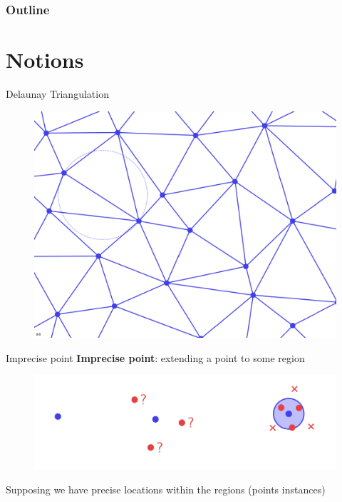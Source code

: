 \documentclass{beamer}
\begin{document}
\begin{frame}
\frametitle{Outline}
\tableofcontents
\end{frame}

\section{Notions}
\frame{\tableofcontents[currentsection]}

\begin{frame}{Delaunay Triangulation}
\begin{figure}
		\centering
	\includegraphics[scale=0.3]{img/delaunayTriangulation.png}
	\end{figure}
\end{frame}

\begin{frame}{Imprecise point}
\textbf{Imprecise point}: extending a point to some region
\begin{figure}
		\centering
	\includegraphics[width=\textwidth]{img/imprecise_point.png}
	\end{figure}
\pause
Supposing we have precise locations within the regions (points instances)
\end{frame}
\end{document}
